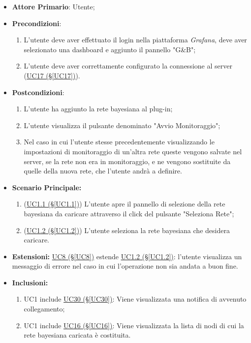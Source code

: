 \begin{itemize}
	\item \textbf{Attore Primario}: Utente;
	\item \textbf{Precondizioni}:
		\begin{enumerate}
			\item L'utente deve aver effettuato il login nella piattaforma \textit{Grafana}, deve aver selezionato una dashboard e aggiunto il pannello "G\&B";
			\item L'utente deve aver correttamente configurato la connessione al server (\hyperref[UC17]{UC17 (§\ref*{UC17})}).
		\end{enumerate}
	\item \textbf{Postcondizioni}:
	\begin{enumerate}
		\item L'utente ha aggiunto la rete bayesiana al plug-in;
		\item L'utente visualizza il pulsante denominato "Avvio Monitoraggio";
		\item Nel caso in cui l'utente stesse precedentemente visualizzando le impostazioni di monitoraggio di un'altra rete queste vengono salvate nel server, se la rete non era in monitoraggio, e ne vengono sostituite da quelle della nuova rete, che l'utente andrà a definire.
	\end{enumerate}
	\item \textbf{Scenario Principale:}
	\begin{enumerate}
		\item (\hyperref[UC1.1]{UC1.1 (§\ref*{UC1.1})}) L'utente apre il pannello di selezione della rete bayesiana da caricare attraverso il click del pulsante "Seleziona Rete";
		\item (\hyperref[UC1.2]{UC1.2 (§\ref*{UC1.2})}) L'utente seleziona la rete bayesiana che desidera caricare.
	\end{enumerate}
	\item \textbf{Estensioni:} \hyperref[UC8]{UC8 (§\ref*{UC8})} estende \hyperref[UC1.2]{UC1.2 (§\ref*{UC1.2})}: l'utente visualizza un messaggio di errore nel caso in cui l'operazione non sia andata a buon fine.
	\item \textbf{Inclusioni:} 
	\begin{enumerate}
		\item UC1 include \hyperref[UC30]{UC30 (§\ref*{UC30})}: Viene visualizzata una notifica di avvenuto collegamento;
		\item UC1 include \hyperref[UC16]{UC16 (§\ref*{UC16})}: Viene visualizzata la lista di nodi di cui la rete bayesiana caricata è costituita.
	\end{enumerate}
\end{itemize}

